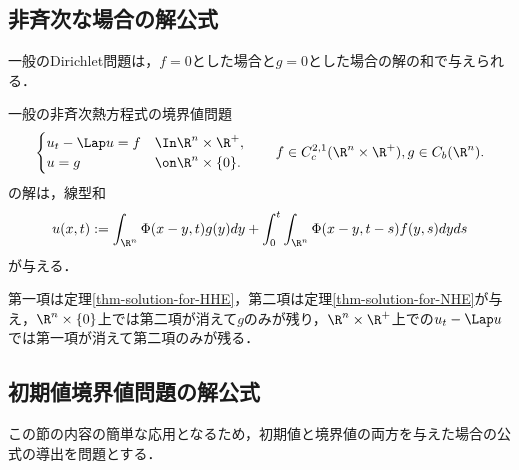 \documentclass[uplatex,dvipdfmx]{jsreport}
\begin{document}
\subsection{非斉次な場合の解公式}

\begin{tcolorbox}[colframe=ForestGreen, colback=ForestGreen!10!white,breakable,colbacktitle=ForestGreen!40!white,coltitle=black,fonttitle=\bfseries\sffamily,
title=]
    一般のDirichlet問題は，$f=0$とした場合と$g=0$とした場合の解の和で与えられる．
\end{tcolorbox}

\begin{corollary}[重ね合わせの原理]\label{cor-solution-to-HE-in-Rn}
    一般の非斉次熱方程式の境界値問題
    \[\begin{cases}
        u_t-\Lap u=f&\In\R^n\times\R^+,\\
        u=g&\on\R^n\times\{0\}.
    \end{cases}\qquad f\in C^{2,1}_c(\R^n\times\R^+),g\in C_b(\R^n).\]
    の解は，線型和
    \[u(x,t):=\int_{\R^n}\Phi(x-y,t)g(y)dy+\int^t_0\int_{\R^n}\Phi(x-y,t-s)f(y,s)dyds\]
    が与える．
\end{corollary}
\begin{Proof}
    第一項は定理\ref{thm-solution-for-HHE}，第二項は定理\ref{thm-solution-for-NHE}が与え，$\R^n\times\{0\}$上では第二項が消えて$g$のみが残り，$\R^n\times\R^+$上での$u_t-\Lap u$では第一項が消えて第二項のみが残る．
\end{Proof}

\subsection{初期値境界値問題の解公式}

\begin{tcolorbox}[colframe=ForestGreen, colback=ForestGreen!10!white,breakable,colbacktitle=ForestGreen!40!white,coltitle=black,fonttitle=\bfseries\sffamily,
title=]
    この節の内容の簡単な応用となるため，初期値と境界値の両方を与えた場合の公式の導出を問題とする．
\end{tcolorbox}
\end{document}

